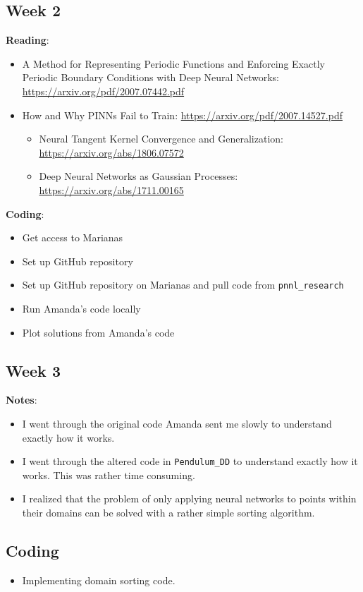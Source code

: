 \documentclass{article}
\def\bf{\textbf}
\begin{document}
\subsection*{Week 2}
\bf{Reading}:
\begin{itemize}
	\item A Method for Representing Periodic Functions and Enforcing Exactly Periodic Boundary Conditions with Deep Neural Networks: \url{https://arxiv.org/pdf/2007.07442.pdf}
	\item How and Why PINNs Fail to Train: \url{https://arxiv.org/pdf/2007.14527.pdf}
	\begin{itemize}
		\item Neural Tangent Kernel Convergence and Generalization: \url{https://arxiv.org/abs/1806.07572}
		\item Deep Neural Networks as Gaussian Processes: \url{https://arxiv.org/abs/1711.00165}
	\end{itemize}
\end{itemize}
\bf{Coding}:
\begin{itemize}
\item Get access to Marianas
\item Set up GitHub repository
\item Set up GitHub repository on Marianas and pull code from \verb|pnnl_research|
\item Run Amanda's code locally
\item Plot solutions from Amanda's code
\end{itemize}
\subsection*{Week 3} 
\bf{Notes}:
\begin{itemize}
\item I went through the original code Amanda sent me slowly to understand exactly how it works.
\item I went through the altered code in \verb|Pendulum_DD| to understand exactly how it works. This was rather time consuming.
\item I realized that the problem of only applying neural networks to points within their domains can be solved with a rather simple sorting algorithm.
\end{itemize}
\subsection*{Coding}
\begin{itemize}
\item Implementing domain sorting code.
\end{itemize}
\end{document}
